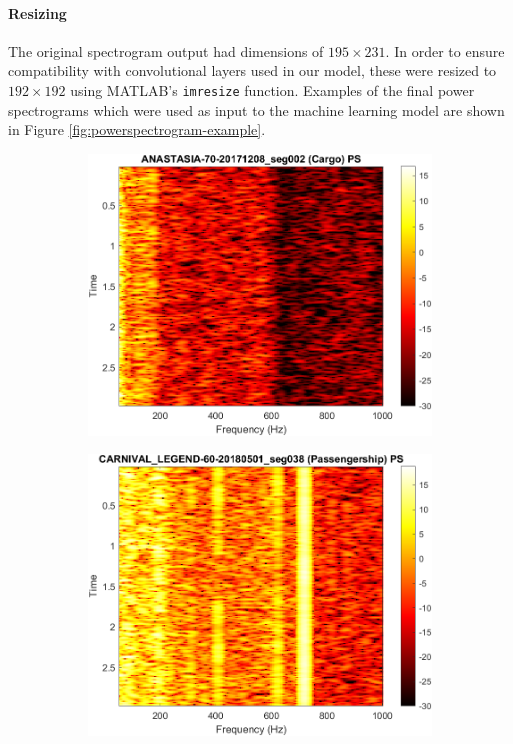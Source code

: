 \paragraph{Resizing}
The original spectrogram output had dimensions of $195 \times 231$. In order to ensure compatibility with convolutional layers used in our model, these were resized to $192 \times 192$ using MATLAB's \texttt{imresize} function. Examples of the final power spectrograms which were used as input to the machine learning model are shown in Figure \ref{fig:powerspectrogram-example}.

\begin{figure}[p]
    \centering
    \begin{subfigure}{0.49\textwidth}
        \centering
        \includegraphics[trim={0 0 1.3cm 0},clip,width=\linewidth]{img/ch3/power_spectrogram/Cargo.png}
    \end{subfigure}
    \begin{subfigure}{0.49\textwidth}
        \centering
        \includegraphics[trim={0 0 1.3cm 0},clip,width=\linewidth]{img/ch3/power_spectrogram/Passengership.png}
    \end{subfigure}


\end{figure}
